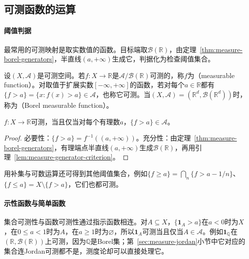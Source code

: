 \subsection{可测函数的运算}
\label{sec:measure-function-operations}

\paragraph{阈值判据}
最常用的可测映射是取实数值的函数。目标端取$\mathcal B(\mathbb R)$，由定理~\ref{thm:measure-borel-generators}，半直线$(a,+\infty)$生成它，判据化为检查阈值集合。

\begin{definition}[可测函数]
\label{def:measure-measurable-function}
设$(X,\mathcal A)$是可测空间。若$f:X\to\mathbb R$是$\mathcal A/\mathcal B(\mathbb R)$可测的，称$f$为（measurable function）。对取值于扩展实数$[-\infty,+\infty]$的函数，若对每个$a\in\mathbb R$都有$\{f>a\}=\{x:f(x)>a\}\in\mathcal A$，也称它可测。当$(X,\mathcal A)=(\mathbb R^d,\mathcal B(\mathbb R^d))$时，称为（Borel measurable function）。
\end{definition}

\begin{lemma}[阈值判据]
\label{lem:measure-threshold}
$f:X\to\mathbb R$可测，当且仅当对每个有理数$a$，$\{f>a\}\in\mathcal A$。
\end{lemma}

\begin{proof}
必要性：$\{f>a\}=f^{-1}((a,+\infty))$。充分性：由定理~\ref{thm:measure-borel-generators}，有理端点半直线$(a,+\infty)$生成$\mathcal B(\mathbb R)$，再用引理~\ref{lem:measure-generator-criterion}。
\end{proof}

用补集与可数运算还可得到其他阈值集合，例如$\{f\ge a\}=\bigcap_n\{f>a-1/n\}$、$\{f\le a\}=X\setminus\{f>a\}$，它们也都可测。

\paragraph{示性函数与简单函数}
集合可测性与函数可测性通过指示函数相连。对$A\subseteq X$，$\{\mathbf 1_A>a\}$在$a<0$时为$X$，在$0\le a<1$时为$A$，在$a\ge1$时为$\varnothing$，所以$\mathbf 1_A$可测当且仅当$A\in\mathcal A$。例如$\mathbf 1_{\mathbb Q}$在$(\mathbb R,\mathcal B(\mathbb R))$上可测，因为$\mathbb Q$是Borel集；第~\ref{sec:measure-jordan}小节中它对应的集合连Jordan可测都不是，测度论却可以直接处理它。

